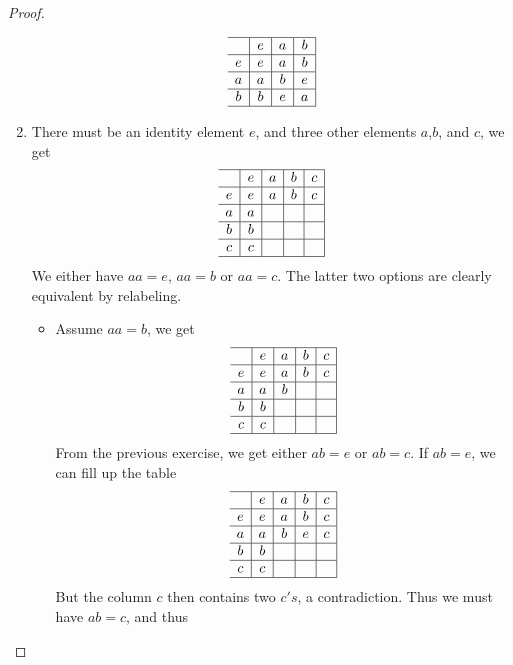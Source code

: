 \documentclass[a4paper, 11pt]{book}
\theoremstyle{plain}
\theoremstyle{plain}
\begin{document}
\begin{proof}
\begin{enumerate}
                  $$\begin{array}{c|c|c|c|}
    \hline
      & e & a & b\\
    \hline
    e & e & a & b\\
    \hline
    a & a & b & e\\
    \hline
    b & b & e & a \\
    \hline
    \end{array}$$
    \item There must be an identity element $e$, and three other elements $a$,$b$, and $c$, we get
               $$\begin{array}{c|c|c|c|c|}
    \hline
      & e & a & b & c\\
    \hline
    e & e & a & b & c\\
    \hline
    a & a &   &   &  \\
    \hline
    b & b &   &   &  \\
    \hline
    c & c &   &   &  \\
    \hline
    \end{array}$$ 
    We either have $aa=e$, $aa=b$ or $aa=c$. The latter two options are clearly equivalent by relabeling. 
    \begin{itemize}
        \item Assume $aa=b$, we get
                       $$\begin{array}{c|c|c|c|c|}
    \hline
      & e & a & b & c\\
    \hline
    e & e & a & b & c\\
    \hline
    a & a & b &   &  \\
    \hline
    b & b &   &   &  \\
    \hline
    c & c &   &   &  \\
    \hline
    \end{array}$$ 
    From the previous exercise, we get either $ab=e$ or $ab=c$. If $ab=e$, we can fill up the table
                        $$\begin{array}{c|c|c|c|c|}
    \hline
      & e & a & b & c\\
    \hline
    e & e & a & b & c\\
    \hline
    a & a & b & e & c\\
    \hline
    b & b &   &   &  \\
    \hline
    c & c &   &   &  \\
    \hline
    \end{array}$$
    But the column $c$ then contains two $c's$, a contradiction. Thus we must have $ab=c$, and thus

\end{itemize}
\end{enumerate}
\end{proof}
\end{document}
